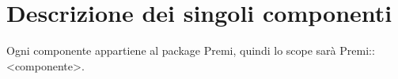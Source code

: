 \newcommand{\tipo}{Tipo, obiettivo e funzione del componente}
\newcommand{\relaz}{Relazioni d'uso di altre componenti}
\newcommand{\interfacce}{Interfacce con e relazioni d'uso e da altre componenti}
\newcommand{\attivita}{Attività svolte e dati trattati}
\newcommand{\mvc}{\parti/MVC/}
\newcommand{\base}{Classi ereditate}
\newcommand{\figli}{Sottoclassi}

\section{Descrizione dei singoli componenti}{
	Ogni componente appartiene al package Premi, quindi lo scope sarà Premi::<componente>.
	
	\newpage
	
	\newpage
	
}